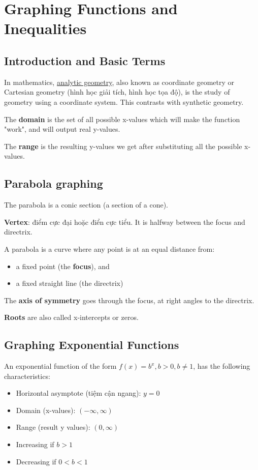 \chapter{Graphing Functions and Inequalities}

\section{Introduction and Basic Terms}

In mathematics, \href{https://en.wikipedia.org/wiki/Analytic_geometry}{analytic geometry}, also known as coordinate geometry or Cartesian geometry (hình học giải tích, hình học tọa độ), is the study of geometry using a coordinate system. This contrasts with synthetic geometry. 

The \textbf{domain} is the set of all possible x-values which will make the function "work", and will output real y-values.

The \textbf{range} is the resulting y-values we get after substituting all the possible x-values.

\section{Parabola graphing}

The parabola is a conic section (a section of a cone).

\textbf{Vertex}: điểm cực đại hoặc điển cực tiểu. It is halfway between the focus and directrix.

A parabola is a curve where any point is at an equal distance from:
\begin{itemize}
	\item a fixed point (the \textbf{focus}), and
    \item a fixed straight line (the directrix)
\end{itemize}

The \textbf{axis of symmetry} goes through the focus, at right angles to the directrix.

\textbf{Roots} are also called x-intercepts or zeros.

\section{Graphing Exponential Functions}

An exponential function of the form \(f(x) = b^{x}, b > 0, b \neq 1\), has the following characteristics:

\begin{itemize}
  \item Horizontal asymptote (tiệm cận ngang): \(y=0\)
  \item Domain (x-values): \((-\infty, \infty)\)
  \item Range (result y values): \((0, \infty)\)
  \item Increasing if \(b>1\)
  \item Decreasing if \(0<b<1\)
\end{itemize}

